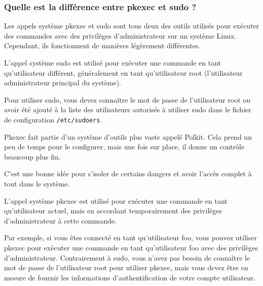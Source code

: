 \documentclass[12pt,a4paper]{article}
\newcommand{\code}[1]{\colorbox{light-gray}{\texttt{#1}}}
\begin{document}
\begin{flushleft}
\begin{flushleft}
                \subsubsection{Quelle est la différence entre pkexec et sudo ?}
                 \begin{flushleft}
                    \noindent Les appels système pkexec et sudo sont tous deux des outils utilisés pour exécuter des commandes avec des privilèges d'administrateur sur un système Linux. Cependant, ils fonctionnent de manières légèrement différentes.
                    \item L'appel système sudo est utilisé pour exécuter une commande en tant qu'utilisateur différent, généralement en tant qu'utilisateur root (l'utilisateur administrateur principal du système). 
                    \item Pour utiliser sudo, vous devez connaître le mot de passe de l'utilisateur root ou avoir été ajouté à la liste des utilisateurs autorisés à utiliser sudo dans le fichier de configuration \code{/etc/sudoers}.
                    \item Pkexec fait partie d'un système d'outils plus vaste appelé Polkit. Cela prend un peu de temps pour le configurer, mais une fois sur place, il donne un contrôle beaucoup plus fin.
                    \item C'est une bonne idée pour s'isoler de certains dangers et avoir l'accès complet à tout dans le système.
                    \item L'appel système pkexec est utilisé pour exécuter une commande en tant qu'utilisateur actuel, mais en accordant temporairement des privilèges d'administrateur à cette commande. 
                    \item Par exemple, si vous êtes connecté en tant qu'utilisateur foo, vous pouvez utiliser pkexec pour exécuter une commande en tant qu'utilisateur foo avec des privilèges d'administrateur. Contrairement à sudo, vous n'avez pas besoin de connaître le mot de passe de l'utilisateur root pour utiliser pkexec, mais vous devez être en mesure de fournir les informations d'authentification de votre compte utilisateur.
                \end{flushleft}
            \end{flushleft}
   		\end{flushleft}
\end{document}
